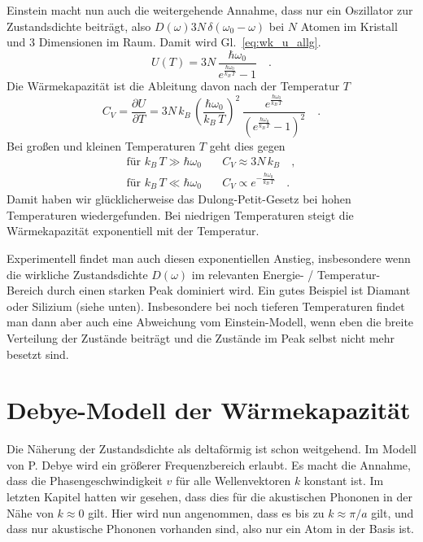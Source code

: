 Einstein macht nun auch die weitergehende Annahme, dass nur ein Oszillator zur  Zustandsdichte beiträgt, also $D(\omega) 3 N \, \delta(\omega_0 - \omega)$ bei $N$ Atomen im Kristall und 3 Dimensionen im Raum. Damit wird Gl.~\ref{eq:wk_u_allg}.
\begin{equation}
U(T) =  3N \, \frac{\hbar \omega_0 }{e^{\frac{\hbar \omega_0}{k_B \, T} }- 1} \quad .
\end{equation}
Die Wärmekapazität ist die Ableitung davon nach der Temperatur $T$
\begin{equation}
C_V = \frac{\partial U}{\partial T }  =3 N \, k_B \, 
\left( \frac{\hbar \omega_0}{k_B \, T} \right)^2 
\, \frac{e^{\frac{\hbar \omega_0}{k_B \, T} }}
{\left( e^{\frac{\hbar \omega_0}{k_B \, T} }- 1 \right)^2} \quad . \label{eq:wk_einstein_full}
\end{equation}
Bei großen und kleinen Temperaturen $T$ geht dies gegen
\begin{align}
\text{für } k_B \, T \gg \hbar \omega_0  \quad & C_V \approx 3 N \, k_B \quad , \\
\text{für } k_B \, T \ll \hbar \omega_0  \quad & C_V \propto e^{-\frac{\hbar \omega_0}{k_B \, T} } \quad .
\end{align}
Damit haben wir glücklicherweise das Dulong-Petit-Gesetz bei hohen Temperaturen wiedergefunden. Bei niedrigen Temperaturen steigt die Wärmekapazität exponentiell mit der Temperatur.

Experimentell findet man auch diesen exponentiellen Anstieg, insbesondere wenn die wirkliche Zustandsdichte $D(\omega)$ im relevanten Energie- / Temperatur-Bereich durch einen starken Peak dominiert wird. Ein gutes Beispiel ist Diamant oder Silizium (siehe unten). Insbesondere bei noch tieferen Temperaturen findet man dann aber auch eine Abweichung vom Einstein-Modell, wenn eben die breite Verteilung der Zustände beiträgt und die Zustände im Peak selbst nicht mehr besetzt sind.



\section{Debye-Modell der Wärmekapazität}

Die Näherung der Zustandsdichte als deltaförmig ist schon weitgehend. Im Modell von P. Debye wird ein größerer Frequenzbereich erlaubt. Es macht die Annahme, dass die Phasengeschwindigkeit $v$ für alle Wellenvektoren $k$ konstant ist. Im letzten Kapitel hatten wir gesehen, dass dies für die akustischen Phononen in der Nähe von $k \approx 0$ gilt. Hier wird nun angenommen, dass es bis zu $k \approx \pi / a$ gilt, und dass nur akustische Phononen vorhanden sind, also nur ein Atom in der Basis ist.

